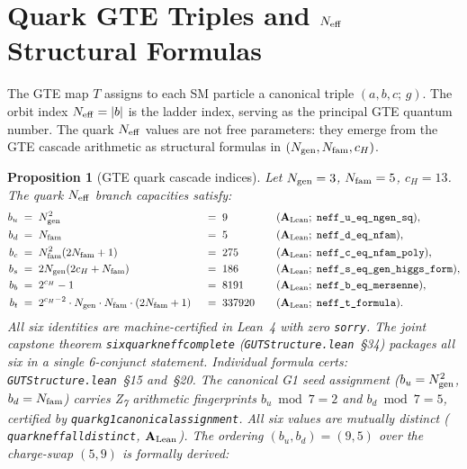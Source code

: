 \documentclass[11pt]{article}
\newtheorem{proposition}[theorem]{Proposition}
\theoremstyle{remark}
\newcommand{\Ngen}{N_{\rm gen}}
\newcommand{\Nfam}{N_{\rm fam}}
\newcommand{\cH}{c_H}
\newcommand{\lean}[1]{%
  \penalty-100
  \begingroup\def\_{\textunderscore\allowbreak}\texttt{#1}\endgroup}
\newcommand{\bu}{b_u}
\newcommand{\bd}{b_d}
\newcommand{\bc}{b_c}
\newcommand{\bs}{b_s}
\newcommand{\bb}{b_b}
\newcommand{\bt}{b_t}
\newcommand{\CatAL}{\ensuremath{\textbf{A}_{\rm Lean}}}
\begin{document}
\section{Quark GTE Triples and \boldmath$N_{\rm eff}$ Structural Formulas}
\label{sec:quark_triples}

The GTE map $T$ assigns to each SM particle a canonical triple $(a, b, c;\,g)$.
The orbit index $N_{\rm eff} = |b|$ is the ladder index, serving as the principal GTE
quantum number.
The quark $N_{\rm eff}$ values are not free parameters: they emerge from the GTE cascade
arithmetic as structural formulas in $(\Ngen, \Nfam, \cH)$.

\begin{proposition}[GTE quark cascade indices]\label{prop:neff_formulas}
Let $\Ngen = 3$, $\Nfam = 5$, $\cH = 13$.  The quark $N_{\rm eff}$ branch capacities
satisfy:
\begin{alignat}{3}
  \bu &\;=\; \Ngen^2                                      &&\;=\; 9      &&\quad (\CatAL;\;\lean{neff\_u\_eq\_ngen\_sq}),    \\
  \bd &\;=\; \Nfam                                        &&\;=\; 5      &&\quad (\CatAL;\;\lean{neff\_d\_eq\_nfam}),         \\
  \bc &\;=\; \Nfam^2(2\Nfam+1)                           &&\;=\; 275    &&\quad (\CatAL;\;\lean{neff\_c\_eq\_nfam\_poly}),   \\
  \bs &\;=\; 2\Ngen(2\cH+\Nfam)                          &&\;=\; 186    &&\quad (\CatAL;\;\lean{neff\_s\_eq\_gen\_higgs\_form}), \\
  \bb &\;=\; 2^{\cH}-1                                    &&\;=\; 8191   &&\quad (\CatAL;\;\lean{neff\_b\_eq\_mersenne}),    \\
  \bt &\;=\; 2^{\cH-2}\cdot\Ngen\cdot\Nfam\cdot(2\Nfam+1) &&\;=\; 337920 &&\quad (\CatAL;\;\lean{neff\_t\_formula}).
\end{alignat}
All six identities are machine-certified in Lean~4 with zero \texttt{sorry}.
The joint capstone theorem \lean{six\_quark\_neff\_complete}
(\texttt{GUTStructure.lean}~\S34) packages all six in a single
6-conjunct statement.
Individual formula certs: \texttt{GUTStructure.lean}~\S15 and~\S20.
The canonical G1 seed assignment ($\bu = \Ngen^2$, $\bd = \Nfam$) carries Z\textsubscript{7}
arithmetic fingerprints $\bu\bmod 7 = 2$ and $\bd\bmod 7 = 5$, certified by
\lean{quark\_g1\_canonical\_assignment}.
All six values are mutually distinct (\lean{quark\_neff\_all\_distinct}, $\CatAL$).
The ordering $(\bu, \bd) = (9, 5)$ over the charge-swap $(5, 9)$ is formally derived:

\end{proposition}
\end{document}
